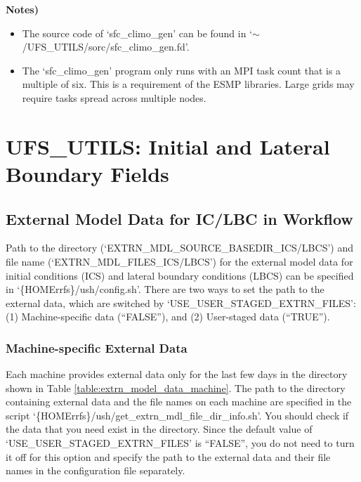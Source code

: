 \documentclass[11pt,fleqn]{report}              %
\begin{document}
{\bf Notes)} 
\begin{itemize}
\item The source code of `sfc\_climo\_gen' can be found in `$\sim$/UFS\_UTILS/sorc/sfc\_climo\_gen.fd'.
\item The `sfc\_climo\_gen' program only runs with an MPI task count that is a multiple of six. This is a requirement of the ESMP libraries. Large grids may require tasks spread across multiple nodes.
\end{itemize}




\chapter{UFS\_UTILS: Initial and Lateral Boundary Fields}                 
\label{chpt:sar_pre_glb2reg}

\section{External Model Data for IC/LBC in Workflow}
\label{sec:wflow_extrn_mdl_data}

Path to the directory (`EXTRN\_MDL\_SOURCE\_BASEDIR\_ICS/LBCS') and file name (`EXTRN\_MDL\_FILES\_ICS/LBCS') for the external model data for initial conditions (ICS) and lateral boundary conditions (LBCS) can be specified in `\{HOMErrfs\}/ush/config.sh'. There are two ways to set the path to the external data, which are switched by `USE\_USER\_STAGED\_EXTRN\_FILES': (1) Machine-specific data (``FALSE''), and (2) User-staged data (``TRUE'').

\subsection{Machine-specific External Data}
\label{subsec:extrn_mdl_machine}

Each machine provides external data only for the last few days in the directory shown in Table \ref{table:extrn_model_data_machine}. The path to the directory containing external data and the file names on each machine are specified in the script `\{HOMErrfs\}/ush/get\_extrn\_mdl\_file\_dir\_info.sh'. You should check if the data that you need exist in the directory. Since the default value of `USE\_USER\_STAGED\_EXTRN\_FILES' is ``FALSE'', you do not need to turn it off for this option and specify the path to the external data and their file names in the configuration file separately. 
\end{document}
